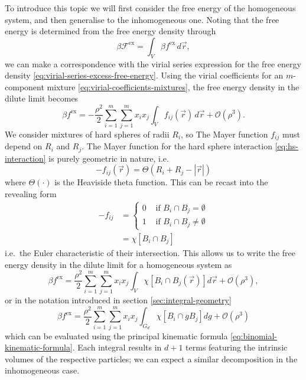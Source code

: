 To introduce this topic we will first consider the free energy of the homogeneous system, and then generalise to the inhomogeneous one.
Noting that the free energy is determined from the free energy density through
\begin{equation*}
  \beta \mathcal{F}^\mathrm{ex} = \int_V \beta f^\mathrm{ex} \, d\vec{r},
\end{equation*}
we can make a correspondence with the virial series expression for the free energy density \eqref{eq:virial-series-excess-free-energy}.
Using the virial coefficients for an $m$-component mixture \eqref{eq:virial-coefficients-mixtures}, the free energy density in the dilute limit becomes%
\begin{equation*}
  \beta f^\mathrm{ex}
  =
  - \frac{\rho^2}{2}
  \sum_{i = 1}^m \sum_{j = 1}^m x_i x_j \int_V
  f_{ij}(\vec{r})
  \, d\vec{r}
  + \mathcal{O}(\rho^3).
\end{equation*}
We consider mixtures of hard spheres of radii $R_i$, so The Mayer function $f_{ij}$ must depend on $R_i$ and $R_j$.
The Mayer function for the hard sphere interaction \eqref{eq:hs-interaction} is purely geometric in nature, i.e.\
\begin{equation*}
  -f_{ij}(\vec{r})
  =
  \Theta(R_i + R_j - |\vec{r}|)
\end{equation*}
where $\Theta(\cdot)$ is the Heaviside theta function.
This can be recast into the revealing form
\begin{equation*}
  \begin{split}
    -f_{ij}
    &=
    \begin{cases}
      0 & \textrm{ if } B_i \cap B_j = \emptyset \\
      1 & \textrm{ if } B_i \cap B_j \ne \emptyset
    \end{cases}
    \\ &=
    \chi[B_i \cap B_j]
  \end{split}
\end{equation*}
i.e.\ the Euler characteristic of their intersection.
This allows us to write the free energy density in the dilute limit for a homogeneous system as
\begin{equation*}
  \beta f^\mathrm{ex}
  =
  \frac{\rho^2}{2}
  \sum_{i=1}^m \sum_{j=1}^m
  x_i x_j
  \int_V \chi[B_i \cap B_j(\vec{r})] d\vec{r}
  + \mathcal{O}(\rho^3),
\end{equation*}
or in the notation introduced in section \ref{sec:integral-geometry}
\begin{equation*}
  \beta f^\mathrm{ex}
  =
  \frac{\rho^2}{2}
  \sum_{i=1}^m \sum_{j=1}^m
  x_i x_j
  \int_{G_d} \chi[B_i \cap g B_j] dg
  + \mathcal{O}(\rho^3)
\end{equation*}
which can be evaluated using the principal kinematic formula \eqref{eq:binomial-kinematic-formula}.
Each integral results in $d+1$ terms featuring the intrinsic volumes of the respective particles; we can expect a similar decomposition in the inhomogeneous case.

